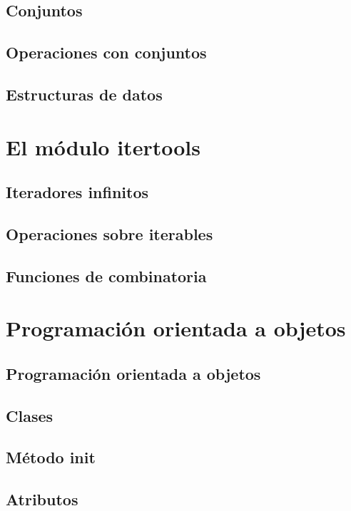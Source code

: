 \documentclass{article}
\begin{document}
\subsection{Conjuntos}

\subsection{Operaciones con conjuntos}

\subsection{Estructuras de datos}

\section{El módulo itertools}

\subsection{Iteradores infinitos}

\subsection{Operaciones sobre iterables}

\subsection{Funciones de combinatoria}

\section{Programación orientada a objetos}

\subsection{Programación orientada a objetos}

\subsection{Clases}

\subsection{Método init}

\subsection{Atributos}
\end{document}
